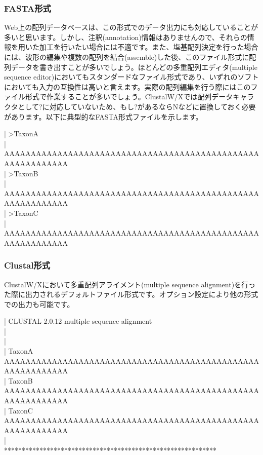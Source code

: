 \documentclass[titlepage,10pt,a4paper]{jsbook}
\newenvironment{content}{\begin{shaded}\vspace{-1em}\raggedright\ttfamily\footnotesize\setlength{\baselineskip}{1.4em}}{\end{shaded}\vspace{-1em}}
\begin{document}
\subsubsection{FASTA形式}
Web上の配列データベースは、この形式でのデータ出力にも対応していることが多いと思います。しかし、注釈(annotation)情報はありませんので、それらの情報を用いた加工を行いたい場合には不適です。また、塩基配列決定を行った場合には、波形の編集や複数の配列を結合(assemble)した後、このファイル形式に配列データを書き出すことが多いでしょう。ほとんどの多重配列エディタ(multiple sequence editor)においてもスタンダードなファイル形式であり、いずれのソフトにおいても入力の互換性は高いと言えます。実際の配列編集を行う際にはこのファイル形式で作業することが多いでしょう。ClustalW/Xでは配列データキャラクタとして{\ttfamily ?}に対応していないため、もし{\ttfamily ?}があるなら{\ttfamily N}などに置換しておく必要があります。以下に典型的なFASTA形式ファイルを示します。
\begin{content}
| {\textgreater}TaxonA\\
| AAAAAAAAAAAAAAAAAAAAAAAAAAAAAAAAAAAAAAAAAAAAAAAAAAAAAAAAAAAA\\
| {\textgreater}TaxonB\\
| AAAAAAAAAAAAAAAAAAAAAAAAAAAAAAAAAAAAAAAAAAAAAAAAAAAAAAAAAAAA\\
| {\textgreater}TaxonC\\
| AAAAAAAAAAAAAAAAAAAAAAAAAAAAAAAAAAAAAAAAAAAAAAAAAAAAAAAAAAAA
\end{content}

\subsubsection{Clustal形式}
ClustalW/Xにおいて多重配列アライメント(multiple sequence alignment)を行った際に出力されるデフォルトファイル形式です。オプション設定により他の形式での出力も可能です。
\begin{content}
| CLUSTAL 2.0.12 multiple sequence alignment\\
| ~\\
| ~\\
| TaxonA~ ~ ~ ~ ~ AAAAAAAAAAAAAAAAAAAAAAAAAAAAAAAAAAAAAAAAAAAAAAAAAAAAAAAAAAAA\\
| TaxonB~ ~ ~ ~ ~ AAAAAAAAAAAAAAAAAAAAAAAAAAAAAAAAAAAAAAAAAAAAAAAAAAAAAAAAAAAA\\
| TaxonC~ ~ ~ ~ ~ AAAAAAAAAAAAAAAAAAAAAAAAAAAAAAAAAAAAAAAAAAAAAAAAAAAAAAAAAAAA\\
| ~ ~ ~ ~ ~ ~ ~ ~ ************************************************************
\end{content}
\end{document}

